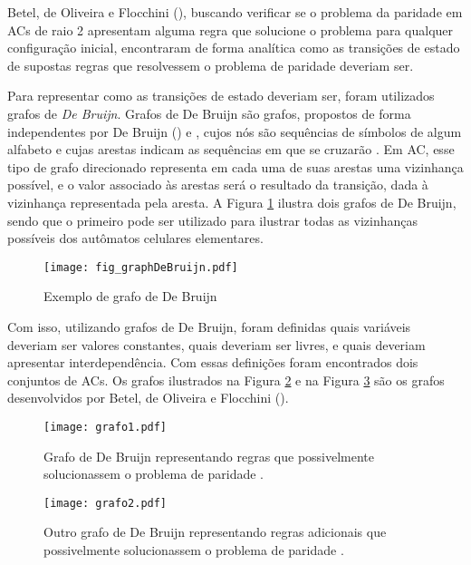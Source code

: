 Betel, de Oliveira e Flocchini (\citeyear{Betel2013}), buscando verificar se o problema da paridade em ACs de raio 2 apresentam alguma regra que solucione o problema para qualquer configuração inicial, encontraram de forma analítica como as transições de estado de supostas regras que resolvessem o problema de paridade deveriam ser. 

Para representar como as transições de estado deveriam ser, foram utilizados grafos de \textit{De Bruijn}. Grafos de De Bruijn são grafos, propostos de forma independentes por De Bruijn (\citeyear{Bruijn946combinatorial}) e , cujos nós são sequências de símbolos de algum alfabeto e cujas arestas indicam as sequências em que se cruzarão \cite{weisstein2015deBruijn}. Em AC, esse tipo de grafo direcionado representa em cada uma de suas arestas uma vizinhança possível, e o valor associado às arestas será o resultado da transição, dada à vizinhança representada pela aresta. A Figura \ref{fig:grafosDeBruijnSample} ilustra dois grafos de De Bruijn, sendo que o primeiro pode ser utilizado para ilustrar todas as vizinhanças possíveis dos autômatos celulares elementares.

\begin{figure}[h!]
\centering
\texttt{[image: fig\_graphDeBruijn.pdf]}
\caption{Exemplo de grafo de De Bruijn \cite{Good1946normal}}
\label{fig:grafosDeBruijnSample}
\end{figure}

Com isso, utilizando grafos de De Bruijn, foram definidas quais variáveis deveriam ser valores constantes, quais deveriam ser livres, e quais deveriam apresentar interdependência. Com essas definições foram encontrados dois conjuntos de ACs. Os grafos ilustrados na Figura \ref{fig:grafosDeBruijn} e na Figura \ref{fig:grafosDeBruijn2} são os grafos desenvolvidos por Betel, de Oliveira e Flocchini (\citeyear{Betel2013}).

\begin{figure}[h!]
\centering
\texttt{[image: grafo1.pdf]}
\caption{Grafo de De Bruijn representando regras que possivelmente solucionassem o problema de paridade \cite{Betel2013}.}
\label{fig:grafosDeBruijn}
\end{figure}

\begin{figure}[h!]
\centering
\texttt{[image: grafo2.pdf]}
\caption{Outro grafo de De Bruijn representando regras adicionais que possivelmente solucionassem o problema de paridade \cite{Betel2013}.}
\label{fig:grafosDeBruijn2}
\end{figure}

